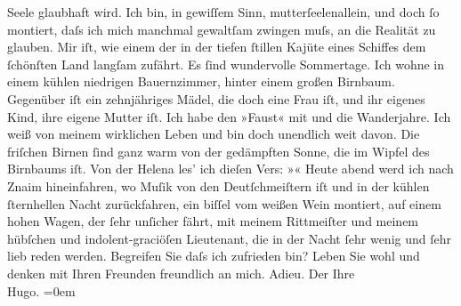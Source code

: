 \begin{ledgroupsized}[t]{13cm}
                    Seele glaubhaft wird. Ich bin, in gewiſſem Sinn, mutterſeelenallein, und {\pb}doch ſo montiert, daſs ich
                    mich manchmal gewaltſam zwingen muſs, an die Realität zu glauben. Mir iſt, wie
                    einem der in der tiefen ſtillen Kajüte eines Schiffes dem ſchönſten Land langſam
                    zufährt.\pend
           \pstart
           Es ſind wundervolle Sommertage. Ich wohne in einem kühlen niedrigen Bauernzimmer,
                    hinter einem großen Birnbaum. Gegenüber iſt ein zehnjähriges Mädel, die doch
                    eine Frau iſt, und ihr eigenes Kind, ihre eigene Mutter iſt. Ich habe den
                        »Faust« mit und die Wanderjahre. Ich weiß von meinem {\pb}wirklichen Leben und bin
                    doch unendlich weit davon.\pend
           \pstart
           Die friſchen Birnen ſind ganz warm von der gedämpften Sonne, die im Wipfel des
                    Birnbaums iſt. Von der Helena les’ ich
                    dieſen Vers: »\label{K_L00476_2v}\label{K_L00476_2h}« Heute abend werd ich nach Znaim hineinfahren, wo Muſik von den Deutſchmeiſtern iſt und in der kühlen ſternhellen
                    Nacht zurückfahren, ein biſſel vom weißen Wein montiert, auf einem hohen Wagen,
                    der ſehr {\pb}unſicher fährt, mit
                    meinem Rittmeiſter und meinem hübſchen und indolent-graciöſen Lieutenant, die in
                    der Nacht ſehr wenig und ſehr lieb reden werden. Begreifen Sie daſs ich
                    zufrieden bin?\pend
           \pstart
           Leben Sie wohl und denken mit Ihren Freunden freundlich an mich. Adieu.\pend
           \pstart
           Der Ihre{\\[\baselineskip]}\spacefill\mbox{Hugo.}\pend
           \leftskip=0em{}
         
         \endnumbering{}\end{ledgroupsized}  \newcommand{\dateiname}{L00476}\newcommand{\titel}{Hugo von Hofmannsthal an Arthur Schnitzler, 21. [8. 1895]}\newcommand{\editorInnen}{Martin Anton Müller und Gerd-Hermann Susen}
      